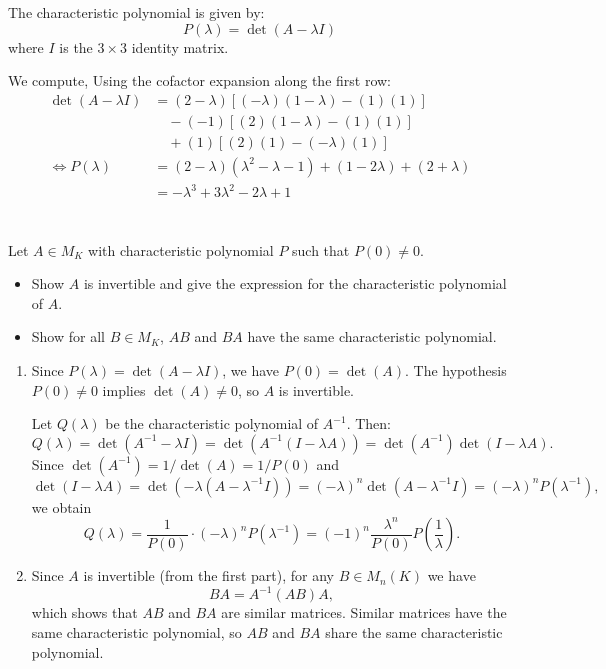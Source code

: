 \documentclass[12pt]{article}
\begin{document}
\begin{correctionbox}
The characteristic polynomial is given by:
\[
P(\lambda) = \det(A - \lambda I)
\]
where \(I\) is the \(3 \times 3\) identity matrix.

We compute, Using the cofactor expansion along the first row:
\begin{align*}
\det(A - \lambda I) &= (2-\lambda)\left[(-\lambda)(1-\lambda) - (1)(1)\right] \\
&\quad - (-1)\left[(2)(1-\lambda) - (1)(1)\right] \\
&\quad + (1)\left[(2)(1) - (-\lambda)(1)\right]\\
\iff P(\lambda) &= (2-\lambda)(\lambda^2 - \lambda - 1) + (1 - 2\lambda) + (2 + \lambda) \\
&= -\lambda^3 + 3\lambda^2 - 2\lambda + 1
\end{align*}
\end{correctionbox}

\section{}
Let \( A \in M_K \) with characteristic polynomial \( P \) such that \( P(0) \neq 0 \).
\begin{itemize}
    \item Show \( A \) is invertible and give the expression for the characteristic polynomial of \( A \).
    \item Show for all \( B \in M_K \), \( AB \) and \( BA \) have the same characteristic polynomial.
\end{itemize}

\begin{correctionbox}
\begin{enumerate}
    \item Since $ P(\lambda) = \det(A - \lambda I) $, we have $ P(0) = \det(A) $. The hypothesis $ P(0) \neq 0 $ implies $ \det(A) \neq 0 $, so $ A $ is invertible. 
    
    Let $ Q(\lambda) $ be the characteristic polynomial of $ A^{-1} $. Then:
    \[
    Q(\lambda) = \det(A^{-1} - \lambda I) = \det(A^{-1}(I - \lambda A)) = \det(A^{-1})\det(I - \lambda A).
    \]
    Since $ \det(A^{-1}) = 1/\det(A) = 1/P(0) $ and 
    \[
    \det(I - \lambda A) = \det(-\lambda(A - \lambda^{-1}I)) = (-\lambda)^n \det(A - \lambda^{-1}I) = (-\lambda)^n P(\lambda^{-1}),
    \]
    we obtain
    \[
    Q(\lambda) = \frac{1}{P(0)} \cdot (-\lambda)^n P(\lambda^{-1}) = (-1)^n \frac{\lambda^n}{P(0)} P\left(\frac{1}{\lambda}\right).
    \]

    \item Since $ A $ is invertible (from the first part), for any $ B \in M_n(K) $ we have
    \[
    BA = A^{-1}(AB)A,
    \]
    which shows that $ AB $ and $ BA $ are similar matrices. Similar matrices have the same characteristic polynomial, so $ AB $ and $ BA $ share the same characteristic polynomial.
\end{enumerate}
\end{correctionbox}
\end{document}
